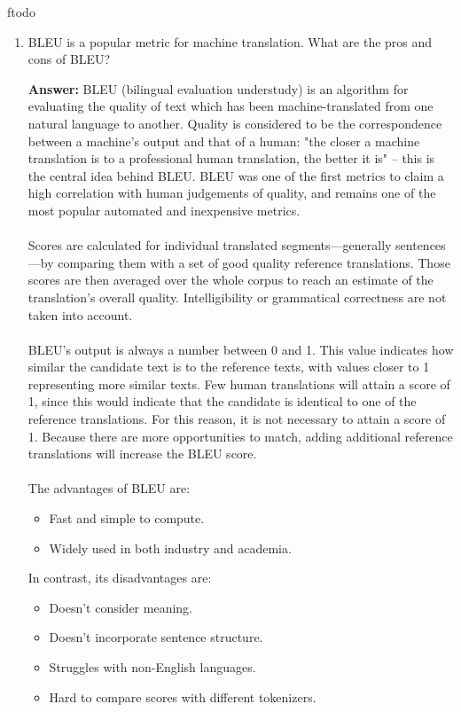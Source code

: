 ƒtodo\documentclass{article}
\newenvironment{QandA}{\begin{enumerate}[label=\arabic*.]}{\end{enumerate}}
\newenvironment{answer}{\par\normalfont \textbf{Answer:}}{}
\begin{document}
\begin{QandA}
    \item BLEU is a popular metric for machine translation. What are the pros and cons of BLEU?
    \begin{answer}
        BLEU (bilingual evaluation understudy) is an algorithm for evaluating the quality of text which has been machine-translated from one natural language to another. Quality is considered to be the correspondence between a machine's output and that of a human: "the closer a machine translation is to a professional human translation, the better it is" – this is the central idea behind BLEU. BLEU was one of the first metrics to claim a high correlation with human judgements of quality, and remains one of the most popular automated and inexpensive metrics.\\\\
        Scores are calculated for individual translated segments—generally sentences—by comparing them with a set of good quality reference translations. Those scores are then averaged over the whole corpus to reach an estimate of the translation's overall quality. Intelligibility or grammatical correctness are not taken into account.\\\\
        BLEU's output is always a number between 0 and 1. This value indicates how similar the candidate text is to the reference texts, with values closer to 1 representing more similar texts. Few human translations will attain a score of 1, since this would indicate that the candidate is identical to one of the reference translations. For this reason, it is not necessary to attain a score of 1. Because there are more opportunities to match, adding additional reference translations will increase the BLEU score.\\\\
        The advantages of BLEU are:
        \begin{itemize}
            \item Fast and simple to compute. 
            \item Widely used in both industry and academia.
        \end{itemize}
        In contrast, its disadvantages are:
        \begin{itemize}
            \item Doesn't consider meaning.
            \item Doesn't incorporate sentence structure.
            \item Struggles with non-English languages.
            \item Hard to compare scores with different tokenizers.
        \end{itemize}


\end{answer}
\end{QandA}
\end{document}
